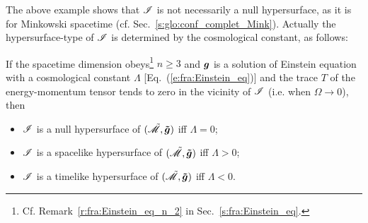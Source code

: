 The above example shows that $\mathscr{I}$ is not necessarily a null hypersurface,
as it is for Minkowski spacetime (cf. Sec.~\ref{s:glo:conf_complet_Mink}).
Actually the hypersurface-type of $\mathscr{I}$ is determined by the cosmological
constant, as follows:
\begin{greybox}
If the spacetime dimension obeys\footnote{Cf. Remark~\ref{r:fra:Einstein_eq_n_2} in
Sec.~\ref{s:fra:Einstein_eq}.}
$n\geq 3$ and $\bm{g}$ is a solution of Einstein equation with
a cosmological constant $\Lambda$ [Eq.~(\ref{e:fra:Einstein_eq})]
and the trace $T$ of the energy-momentum tensor tends to zero in the
vicinity of $\mathscr{I}$ (i.e. when $\Omega\rightarrow 0$), then
\begin{itemize}
\item $\mathscr{I}$ is a null hypersurface of $(\tilde{\mathscr{M}},\bm{\tilde{g}})$ iff $\Lambda=0$;
\item $\mathscr{I}$ is a spacelike hypersurface of $(\tilde{\mathscr{M}},\bm{\tilde{g}})$ iff $\Lambda>0$;
\item $\mathscr{I}$ is a timelike hypersurface of $(\tilde{\mathscr{M}},\bm{\tilde{g}})$ iff $\Lambda<0$.
\end{itemize}
\end{greybox}
